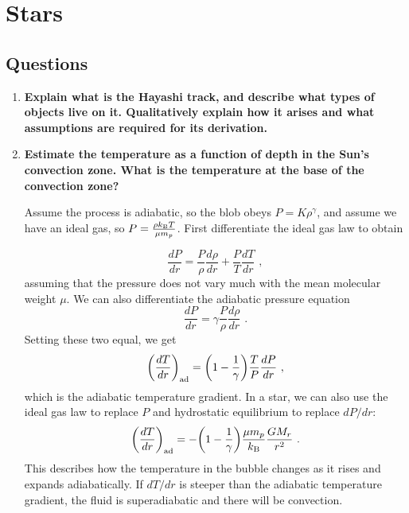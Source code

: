 \section{Stars}


\subsection{Questions}
\begin{enumerate}
\item \textbf{Explain what is the Hayashi track, and describe what types of objects live on it.
      Qualitatively explain how it arises and what assumptions are required for its derivation.}
\item \textbf{Estimate the temperature as a function of depth in the Sun's convection zone. What is the temperature at the base of the convection zone?}

	Assume the process is adiabatic, so the blob obeys $P = K \rho ^\gamma$, and assume we have an ideal gas, so $P = \frac{\rho k_{\rm B} T}{\mu m_p}$. First differentiate the ideal gas law to obtain
	
	\begin{equation}
	\frac{dP}{dr} = \frac{P}{\rho} \frac{d \rho}{dr} + \frac{P}{T} \frac{d T}{dr} \,\, ,
	\end{equation}
	assuming that the pressure does not vary much with the mean molecular weight $\mu$. We can also differentiate the adiabatic pressure equation
	\begin{equation}
	\frac{dP}{dr} = \gamma \frac{P}{\rho}\frac{d\rho}{dr}\,\, .
	\end{equation}
	Setting these two equal, we get
	\begin{equation}
	\biggl(\frac{dT}{dr}\biggr)_{\rm ad} = \biggl(1 - \frac{1}{\gamma}\biggr)\frac{T}{P} \frac{dP}{dr}\,\, ,
	\end{equation}
	which is the adiabatic temperature gradient. In a star, we can also use the ideal gas law to replace $P$ and hydrostatic equilibrium to replace $dP/dr$:
	\begin{equation}
	\biggl(\frac{dT}{dr}\biggr)_{\rm ad} = -\biggl(1 - \frac{1}{\gamma}\biggr)\frac{\mu m_p}{k_{\rm B}} \frac{G M_r}{r^2}\,\, .
	\end{equation}
	This describes how the temperature in the bubble changes as it rises and expands adiabatically. If $dT/dr$ is steeper than the adiabatic temperature gradient, the fluid is superadiabatic and there will be convection.
	

\end{enumerate}
